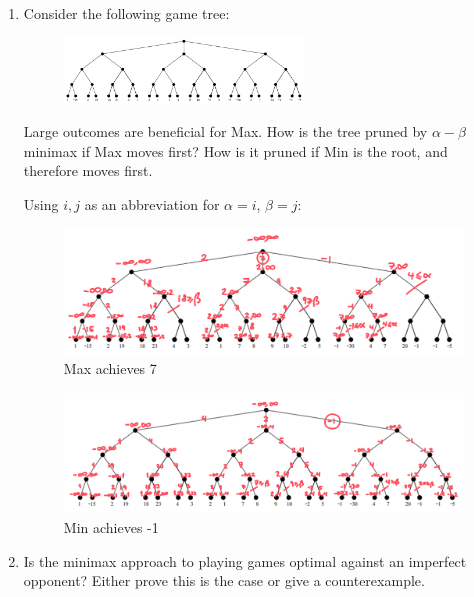 \documentclass[10pt,\jkfside,a4paper]{article}
\begin{document}
\begin{enumerate}

\item Consider the following game tree:

\begin{figure}[H]
\centering
\includegraphics[width=0.6\textwidth]{minmaxtree}
\end{figure}

Large outcomes are beneficial for Max. How is the tree pruned by $\alpha -
\beta$ minimax if Max moves first? How is it pruned if Min is the root, and
therefore moves first.

Using $i, j$ as an abbreviation for $\alpha = i$, $\beta = j$:

\begin{figure}[H]
\centering
\includegraphics[width=\textwidth]{maxtree}
\caption{Max achieves 7}
\end{figure}

\begin{figure}[H]
\centering
\includegraphics[width=\textwidth]{mintree}
\caption{Min achieves -1}
\end{figure}

\setcounter{enumi}{2}

\item Is the minimax approach to playing games optimal against an imperfect
opponent? Either prove this is the case or give a counterexample.


\end{enumerate}
\end{document}
